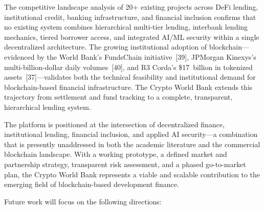 \documentclass[12pt,a4paper]{report}
\begin{document}
The competitive landscape analysis of 20+ existing projects across DeFi lending, institutional credit, banking infrastructure, and financial inclusion confirms that no existing system combines hierarchical multi-tier lending, interbank lending mechanics, tiered borrower access, and integrated AI/ML security within a single decentralized architecture. The growing institutional adoption of blockchain---evidenced by the World Bank's FundsChain initiative~[39], JPMorgan Kinexys's multi-billion-dollar daily volumes~[40], and R3 Corda's \$17~billion in tokenized assets~[37]---validates both the technical feasibility and institutional demand for blockchain-based financial infrastructure. The Crypto World Bank extends this trajectory from settlement and fund tracking to a complete, transparent, hierarchical lending system.

The platform is positioned at the intersection of decentralized finance, institutional lending, financial inclusion, and applied AI security---a combination that is presently unaddressed in both the academic literature and the commercial blockchain landscape. With a working prototype, a defined market and partnership strategy, transparent risk assessment, and a phased go-to-market plan, the Crypto World Bank represents a viable and scalable contribution to the emerging field of blockchain-based development finance.

Future work will focus on the following directions:
\end{document}
